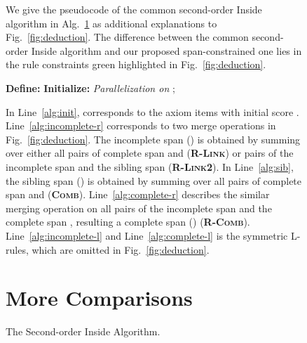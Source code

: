 \documentclass[11pt]{article}
\begin{document}
\begin{figure}[tb!]
We give the pseudocode of the common second-order Inside algorithm \cite{mcdonald-pereira-2006-online} in Alg.~\ref{alg:inside-2o} as additional explanations to Fig.~\ref{fig:deduction}.
The difference between the common second-order Inside algorithm and our proposed span-constrained one lies in the rule constraints green highlighted in Fig.~\ref{fig:deduction}.
\begin{algorithm}[tb!]
    \begin{algorithmic}[1]
        \newlength{\commentindent}
        \setlength{\commentindent}{.24\textwidth}
        \renewcommand{\algorithmiccomment}[1]{\unskip\hfill\makebox[\commentindent][l]{~#1}\par}
        \LetLtxMacro{\oldalgorithmic}{\algorithmic}
        \renewcommand{\algorithmic}[1][0]{\oldalgorithmic[#1]
            \renewcommand{\ALC@com}[1]{\ifnum\pdfstrcmp{##1}{default}=0\else\algorithmiccomment{##1}\fi}
        }
        \STATE \textbf{Define:} 
        \STATE  {}
        \STATE \textbf{Initialize:} \label{alg:init}
        \STATE \emph{Parallelization on} ; 
        \STATE \label{alg:incomplete-r}
        \STATE \label{alg:incomplete-l}


        \STATE \label{alg:sib}
        \STATE \label{alg:complete-r}
        \STATE \label{alg:complete-l}
        \ENDFOR
        \RETURN 
    \end{algorithmic}
    \caption{The Second-order Inside Algorithm.}
    \label{alg:inside-2o}
\end{algorithm}

In Line~\ref{alg:init},  corresponds to the axiom items  with initial score .
Line~\ref{alg:incomplete-r} corresponds to two merge operations in Fig.~\ref{fig:deduction}.
The incomplete span  () is obtained by summing over either all pairs of complete span  and  (\textbf{\textsc{R-Link}}) or pairs of the incomplete span  and the sibling span  (\textbf{\textsc{R-Link2}}).
In Line~\ref{alg:sib}, the sibling span  () is obtained by summing over all pairs of complete span  and  (\textbf{\textsc{Comb}}).
Line~\ref{alg:complete-r} describes the similar merging operation on all pairs of the incomplete span  and the complete span , resulting a complete span  () (\textbf{\textsc{R-Comb}}).
Line~\ref{alg:incomplete-l} and Line~\ref{alg:complete-l} is the symmetric L-rules, which are omitted in Fig.~\ref{fig:deduction}.

\section{More Comparisons}\label{sec:incomparable}


\end{figure}
\end{document}
